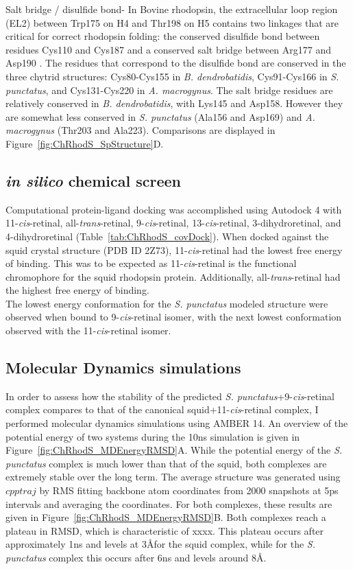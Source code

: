 \indent Salt bridge / disulfide bond- In Bovine rhodopsin, the extracellular loop region (EL2) between Trp175 on H4 and Thr198 on H5 contains two linkages that are critical for correct rhodopsin folding: the conserved disulfide bond between residues Cys110 and Cys187 and a conserved salt bridge between Arg177 and Asp190 \cite{Smith2010}. The residues that correspond to the disulfide bond are conserved in the three chytrid structures: Cys80-Cys155 in \textit{B. dendrobatidis}, Cys91-Cys166 in \textit{S. punctatus}, and Cys131-Cys220 in \textit{A. macrogynus}. The salt bridge residues are relatively conserved in \textit{B. dendrobatidis}, with Lys145 and Asp158. However they are somewhat less conserved in \textit{S. punctatus} (Ala156 and Asp169) and \textit{A. macrogynus} (Thr203 and Ala223). Comparisons are displayed in Figure~\ref{fig:ChRhodS_SpStructure}D.
\subsection*{\textit{in silico} chemical screen}
Computational protein-ligand docking was accomplished using Autodock 4 with 11-\textit{cis}-retinal, all-\textit{trans}-retinal, 9-\textit{cis}-retinal, 13-\textit{cis}-retinal, 3-dihydroretinal, and 4-dihydroretinal (Table~\ref{tab:ChRhodS_covDock}). When docked against the squid crystal structure (PDB ID 2Z73), 11-\textit{cis}-retinal had the lowest free energy of binding. This was to be expected as 11-\textit{cis}-retinal is the functional chromophore for the squid rhodopsin protein. Additionally, all-\textit{trans}-retinal had the highest free energy of binding.\\
\indent The lowest energy conformation for the \textit{S. punctatus} modeled structure were observed when bound to 9-\textit{cis}-retinal isomer, with the next lowest conformation observed with the 11-\textit{cis}-retinal isomer.\\
\subsection*{Molecular Dynamics simulations}
In order to assess how the stability of the predicted \textit{S. punctatus}+9-\textit{cis}-retinal complex compares to that of the canonical squid+11-\textit{cis}-retinal complex, I performed molecular dynamics simulations using AMBER 14. An overview of the potential energy of two systems during the 10ns simulation is given in Figure~\ref{fig:ChRhodS_MDEnergyRMSD}A. While the potential energy of the \textit{S. punctatus} complex is much lower than that of the squid, both complexes are extremely stable over the long term. The average structure was generated using $cpptraj$ by RMS fitting backbone atom coordinates from 2000 snapshots at 5ps intervals and averaging the coordinates. For both complexes, these results are given in Figure~\ref{fig:ChRhodS_MDEnergyRMSD}B. Both complexes reach a plateau in RMSD, which is characteristic of xxxx. This plateau occurs after approximately 1ns and levels at 3\AA  for the squid complex, while for the \textit{S. punctatus} complex this occurs after 6ns and levels around 8\AA.\\
